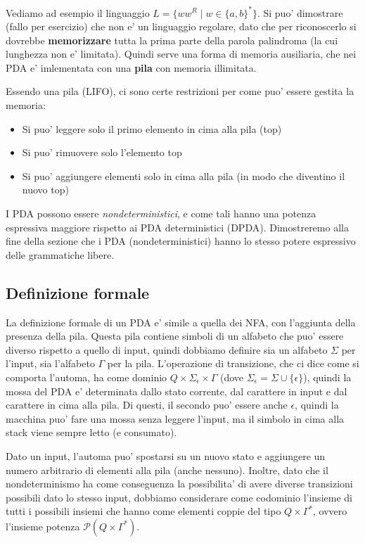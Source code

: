 Vediamo ad esempio il linguaggio $ L = \{ww^R \mid w \in \{a, b\}^*\} $. Si puo' dimostrare (fallo per esercizio) che non e' un linguaggio regolare, dato che per riconoscerlo si dovrebbe \textbf{memorizzare} tutta la prima parte della parola palindroma (la cui lunghezza non e' limitata). Quindi serve una forma di memoria ausiliaria, che nei PDA e' imlementata con una \textbf{pila} con memoria illimitata. 

Essendo una pila (LIFO), ci sono certe restrizioni per come puo' essere gestita la memoria:
\begin{itemize}
  \item Si puo' leggere solo il primo elemento in cima alla pila (top)
  \item Si puo' rimuovere solo l'elemento top
  \item Si puo' aggiungere elementi solo in cima alla pila (in modo che diventino il nuovo top)
\end{itemize}

I PDA possono essere \textit{nondeterministici}, e come tali hanno una potenza espressiva maggiore rispetto ai PDA deterministici (DPDA). Dimostreremo alla fine della sezione che i PDA (nondeterministici) hanno lo stesso potere espressivo delle grammatiche libere.

\subsection{Definizione formale}
La definizione formale di un PDA e' simile a quella dei NFA, con l'aggiunta della presenza della pila. Questa pila contiene simboli di un alfabeto che puo' essere diverso rispetto a quello di input, quindi dobbiamo definire sia un alfabeto $ \Sigma $ per l'input, sia l'alfabeto $ \Gamma $ per la pila. L'operazione di transizione, che ci dice come si comporta l'automa, ha come dominio $ Q \times \Sigma_\epsilon \times \Gamma $ (dove $ \Sigma_\epsilon = \Sigma \cup \{\epsilon\} $), quindi la mossa del PDA e' determinata dallo stato corrente, dal carattere in input e dal carattere in cima alla pila. Di questi, il secondo puo' essere anche $ \epsilon $, quindi la macchina puo' fare una mossa senza leggere l'input, ma il simbolo in cima alla stack viene sempre letto (e consumato). 

Dato un input, l'automa puo' spostarsi su un nuovo stato e aggiungere un numero arbitrario di elementi alla pila (anche nessuno). Inoltre, dato che il nondeterminismo ha come conseguenza la possibilita' di avere diverse transizioni possibili dato lo stesso input, dobbiamo considerare come codominio l'insieme di tutti i possibili insiemi che hanno come elementi coppie del tipo $ Q \times \Gamma^* $, ovvero l'insieme potenza $ \mathcal{P}(Q \times \Gamma^*) $. 

